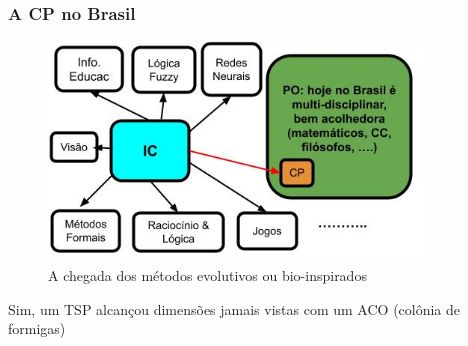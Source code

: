 \documentclass{beamer}
\begin{document}
\begin{frame}[fragile]
\frametitle{A CP no Brasil}

\begin{figure}[!ht]
\begin{center}
\includegraphics[width=0.90\textwidth, height=0.65\textheight]{figures/ia_brasil_2020.jpg}
\caption{A chegada dos métodos evolutivos ou bio-inspirados}
\end{center}
\end{figure}
\pause
Sim, um TSP  alcançou dimensões jamais vistas com um ACO (colônia de formigas)
\end{frame}
%
\end{document}
